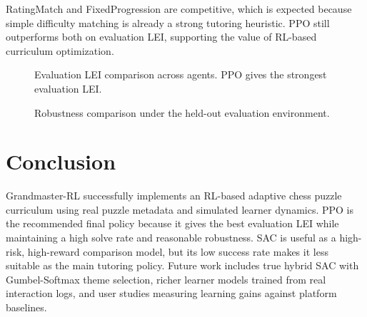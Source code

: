 \documentclass[10pt,twocolumn]{article}
\begin{document}
RatingMatch and FixedProgression are competitive, which is expected because simple
difficulty matching is already a strong tutoring heuristic. PPO still outperforms both
on evaluation LEI, supporting the value of RL-based curriculum optimization.

\begin{figure}[h]
\centering
{}
\caption{Evaluation LEI comparison across agents. PPO gives the strongest evaluation LEI.}
\end{figure}

\begin{figure}[h]
\centering
{}
\caption{Robustness comparison under the held-out evaluation environment.}
\end{figure}

\section{Conclusion}

Grandmaster-RL successfully implements an RL-based adaptive chess puzzle curriculum
using real puzzle metadata and simulated learner dynamics. PPO is the recommended final
policy because it gives the best evaluation LEI while maintaining a high solve rate and
reasonable robustness. SAC is useful as a high-risk, high-reward comparison model, but
its low success rate makes it less suitable as the main tutoring policy. Future work
includes true hybrid SAC with Gumbel-Softmax theme selection, richer learner models
trained from real interaction logs, and user studies measuring learning gains against
platform baselines.
\end{document}
